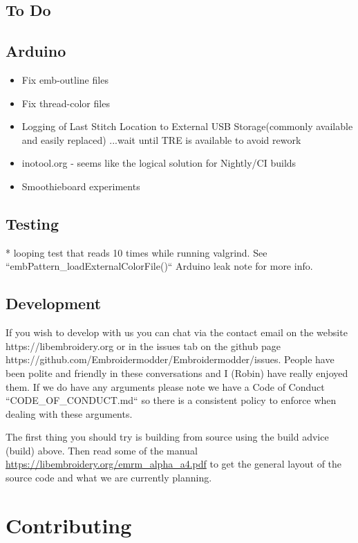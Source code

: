 \documentclass[a4paper]{report}
\begin{document}
\subsection{To Do}

\subsection{Arduino}

\begin{itemize}
\item Fix emb-outline files
\item Fix thread-color files
\item Logging of Last Stitch Location to External USB Storage(commonly available and easily replaced) ...wait until TRE is available to avoid rework
\item inotool.org - seems like the logical solution for Nightly/CI builds
\item Smoothieboard experiments
\end{itemize}

\subsection{Testing}

* looping test that reads 10 times while running valgrind. See ``embPattern\_loadExternalColorFile()`` Arduino leak note for more info.

\subsection{Development}

If you wish to develop with us you can chat via the contact email
on the website https://libembroidery.org or in the issues tab on the
github page https://github.com/Embroidermodder/Embroidermodder/issues.
People have been polite and friendly in these conversations and I (Robin)
have really enjoyed them.
If we do have any arguments please note we have a
Code of Conduct ``CODE\_OF\_CONDUCT.md`` so there is a consistent policy to
enforce when dealing with these arguments.

The first thing you should try is building from source using the  build advice (build)
above. Then read some of the  manual
\url{https://libembroidery.org/emrm_alpha_a4.pdf} to get the general
layout of the source code and what we are currently planning.

\section{Contributing}
\end{document}
